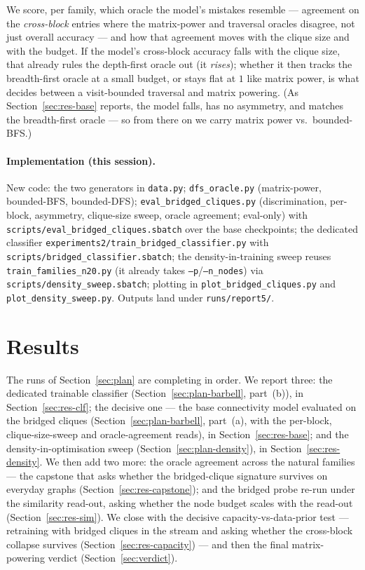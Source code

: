 \documentclass[11pt,a4paper]{article}
\begin{document}
We score, per family, which oracle the model's mistakes resemble --- agreement on the
\emph{cross-block} entries where the matrix-power and traversal oracles disagree, not just overall
accuracy --- and how that agreement moves with the clique size and with the budget. If the model's
cross-block accuracy falls with the clique size, that already rules the depth-first oracle out (it
\emph{rises}); whether it then tracks the breadth-first oracle at a small budget, or stays flat at
$1$ like matrix power, is what decides between a visit-bounded traversal and matrix powering.
(As Section~\ref{sec:res-base} reports, the model falls, has no asymmetry, and matches the
breadth-first oracle --- so from there on we carry matrix power vs.\ bounded-BFS.)

\paragraph{Implementation (this session).} New code: the two generators in \texttt{data.py};
\texttt{dfs\_oracle.py} (matrix-power, bounded-BFS, bounded-DFS); \texttt{eval\_bridged\_cliques.py}
(discrimination, per-block, asymmetry, clique-size sweep, oracle agreement; eval-only) with
\texttt{scripts/eval\_bridged\_cliques.sbatch} over the base checkpoints; the dedicated
classifier \texttt{experiments2/train\_bridged\_classifier.py} with
\texttt{scripts/bridged\_classifier.sbatch}; the density-in-training sweep reuses
\texttt{train\_families\_n20.py} (it already takes \texttt{--p}/\texttt{--n\_nodes}) via
\texttt{scripts/density\_sweep.sbatch}; plotting in \texttt{plot\_bridged\_cliques.py} and
\texttt{plot\_density\_sweep.py}. Outputs land under \texttt{runs/report5/}.

\section{Results}
\label{sec:results}

The runs of Section~\ref{sec:plan} are completing in order. We report three: the dedicated
trainable classifier (Section~\ref{sec:plan-barbell}, part~(b)), in
Section~\ref{sec:res-clf}; the decisive one --- the base connectivity model evaluated on
the bridged cliques (Section~\ref{sec:plan-barbell}, part~(a), with the per-block,
clique-size-sweep and oracle-agreement reads), in Section~\ref{sec:res-base}; and the
density-in-optimisation sweep (Section~\ref{sec:plan-density}), in
Section~\ref{sec:res-density}. We then add two more: the oracle agreement across the natural
families --- the capstone that asks whether the bridged-clique signature survives on everyday graphs
(Section~\ref{sec:res-capstone}); and the bridged probe re-run under the similarity read-out, asking
whether the node budget scales with the read-out (Section~\ref{sec:res-sim}). We close with the
decisive capacity-vs-data-prior test --- retraining with bridged cliques in the stream and asking
whether the cross-block collapse survives (Section~\ref{sec:res-capacity}) --- and then the final
matrix-powering verdict (Section~\ref{sec:verdict}).
\end{document}
